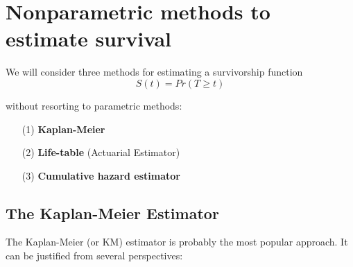 \documentclass[11pt,slidesonly,semrot,portrait,palatino]{book}
\begin{document}
\setlength{\evensidemargin}{0in} \setlength{\oddsidemargin}{.5in}
\setlength{\topmargin}{0in} \setlength{\textwidth}{6in}
\setlength{\textheight}{9in} \setcounter{page}{29}
\setcounter{chapter}{2}
\chapter{Nonparametric methods to estimate survival}
\noindent

We will consider three methods for estimating a survivorship
function
$$S(t) = Pr(T \ge t)$$

without resorting to parametric methods:

\begin{itemize}
\item[(1)] {\bf Kaplan-Meier}
\item[(2)] {\bf Life-table} (Actuarial Estimator)
\item[(3)] {\bf Cumulative hazard estimator}
\end{itemize}
\section{The Kaplan-Meier Estimator}

The Kaplan-Meier (or KM) estimator is probably the most
popular approach.  It can be justified from several
perspectives:
\end{document}
